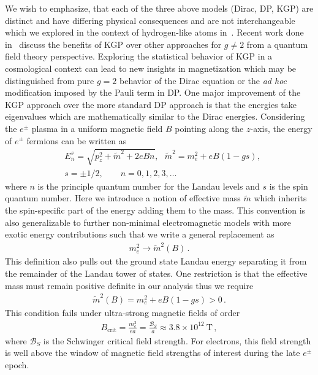 \documentclass[twocolumn,preprintnumbers,amsmath,amssymb]{revtex4-2}
\begin{document}
We wish to emphasize, that each of the three above models (Dirac, DP, KGP) are distinct and have differing physical consequences and are not interchangeable which we explored in the context of hydrogen-like atoms in~\cite{Steinmetz:2018ryf}. Recent work done in~\cite{rafelski2023study} discuss the benefits of KGP over other approaches for $g\neq2$ from a quantum field theory perspective. Exploring the statistical behavior of KGP in a cosmological context can lead to new insights in magnetization which may be distinguished from pure $g=2$ behavior of the Dirac equation or the \emph{ad hoc} modification imposed by the Pauli term in DP. One major improvement of the KGP approach over the more standard DP approach is that the energies take eigenvalues which are mathematically similar to the Dirac energies. Considering the $e^\pm$ plasma in a uniform magnetic field $B$ pointing along the $z$-axis, the energy of $e^\pm$ fermions can be written as
\begin{align}
 \label{KGPEnergy} &E_{n}^{s}\!=\!\sqrt{p^2_z+\tilde{m}^2+2eBn},\,\,\,\,\tilde{m}^2=m^2_e+eB\left(1-gs\right),\\
 &s=\pm{1}/{2},\qquad n=0,1,2,3,\dots
\end{align}
where $n$ is the principle quantum number for the Landau levels and $s$ is the spin quantum number. Here we introduce a notion of effective mass $\tilde{m}$ which inherits the spin-specific part of the energy adding them to the mass. This convention is also generalizable to further non-minimal electromagnetic models with more exotic energy contributions such that we write a general replacement as
\begin{align}
 \label{MagMass} m_{e}^{2}\rightarrow\tilde{m}^2(B)\,.
\end{align}
This definition also pulls out the ground state Landau energy separating it from the remainder of the Landau tower of states. One restriction is that the effective mass must remain positive definite in our analysis thus we require
\begin{align}
 \label{MassLimit} \tilde{m}^2(B)=m^2_e+eB\left(1-gs\right)>0\,.
\end{align}
This condition fails under ultra-strong magnetic fields of order
\begin{align}
 \label{MagMassFail} B_{\mathrm{crit}}=\frac{m_{e}^{2}}{ea}=\frac{\mathcal{B}_{S}}{a}\approx3.8\times10^{12}\ \mathrm{T}\,,
\end{align}
where $\mathcal{B}_{S}$ is the Schwinger critical field strength. For electrons, this field strength is well above the window of magnetic field strengths of interest during the late $e^{\pm}$ epoch.
\end{document}
